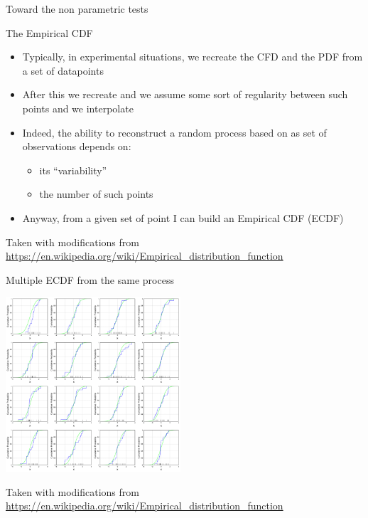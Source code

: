 \documentclass{beamer}
\begin{document}



\begin{frame}
{\centerline{Toward the non parametric tests}}

\begin{center}
\LARGE The Empirical CDF
\end{center}

\begin{itemize}
    \item Typically, in experimental situations, we recreate the CFD and the PDF from a set of datapoints
    \item After this we recreate and we assume some sort of regularity between such points and we interpolate
    \item Indeed, the ability to reconstruct a random process based on as set of observations depends on:
    \begin{itemize}
    \item its ``variability''
    \item the number of such points
\end{itemize}
    \item Anyway, from a given set of point I can build an Empirical CDF (ECDF)
\end{itemize}

\begin{center}
\tiny{Taken with modifications from \url{https://en.wikipedia.org/wiki/Empirical_distribution_function}}
\end{center}

\end{frame}

\begin{frame}
{\centerline{Multiple ECDF from the same process}}

\begin{center}
\includegraphics[width=6.5cm]{P2023.AIBCCSS.InferenceAndLogisticRegression/1920px-ECDF-100.png}
\end{center}

\begin{center}
\tiny{Taken with modifications from \url{https://en.wikipedia.org/wiki/Empirical_distribution_function}}
\end{center}

\end{frame}
\end{document}
